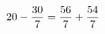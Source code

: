 \documentclass[preview]{standalone}
\begin{document}
\begin{align*}
\special{dvisvgm:raw <g id='unique000'>}20 - \frac{30}{7} = \frac{56}{7} + \frac{54}{7}\special{dvisvgm:raw </g>}
\end{align*}
\end{document}
